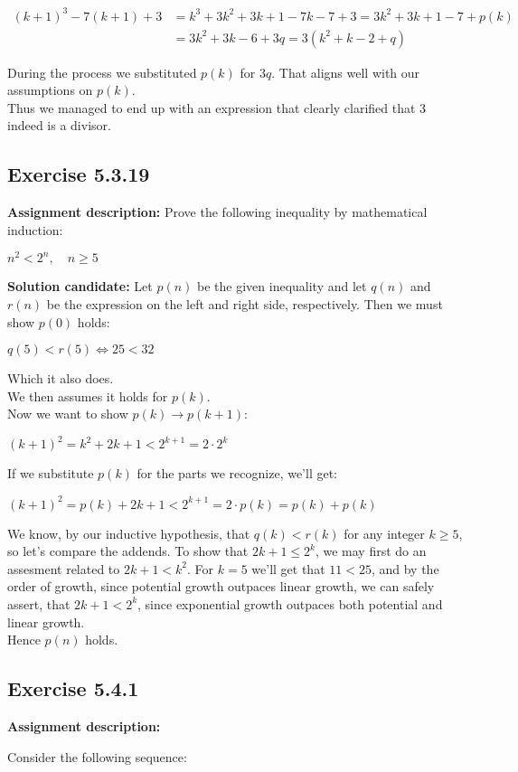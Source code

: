 \documentclass{report}
\newcommand{\cent}[1]{\begin{center}#1\end{center}}
\newcommand{\mAlign}[1]{\begin{align*}#1\end{align*}}
\newcommand{\AssignmentDescription}{\textbf{Assignment description: }}
\newcommand{\Solution}{\textbf{Solution candidate: }}
\newcommand{\QED}{\boxed{}}
\newcommand{\Exercise}[1]{\subsection{Exercise #1}}
\newcommand{\parenthesis}[1]{\left( #1 \right)}
\begin{document}
 	\mAlign{
 		(k+1)^3-7(k+1) + 3 &= k^3+3k^2+3k+1 -7k-7 + 3 = 3k^2+3k+1-7 + p(k) \\ 
 		&= 3k^2+3k-6 + 3q = 3 \parenthesis{k^2+k-2+q}
 	}
 	
 	During the process we substituted $p(k)$ for $3q$. That aligns well with our assumptions on $p(k)$.\\
 	
 	Thus we managed to end up with an expression that clearly clarified that 3 indeed is a divisor.\\
 	\QED
 	
 	\Exercise{5.3.19}
 	
 	\AssignmentDescription
 	Prove the following inequality by mathematical induction:
 	
 	\cent{$n^2 < 2^n, \quad n \geq 5$}
 	
 	\Solution
 	Let $p(n)$ be the given inequality and let $q(n)$ and $r(n)$ be the expression on the left and right side, respectively. Then we must show $p(0)$ holds:
 	
 	\cent{$ q(5) < r(5) \Leftrightarrow 25  < 32$}
 	
 	Which it also does.\\
 	
 	We then assumes it holds for $p(k)$.\\
 	
 	Now we want to show $p(k) \to p(k+1)$:
 	
 	\cent{$(k+1)^2 = k^2+2k+1 < 2^{k+1} = 2\cdot 2^k$}
 	
 	If we substitute $p(k)$ for the parts we recognize, we'll get:
 	
 	\cent{$(k+1)^2 = p(k) +2k+1 < 2^{k+1} = 2\cdot p(k) = p(k) + p(k)$}
 	
 	We know, by our inductive hypothesis, that $q(k) < r(k)$ for any integer $k \geq 5$, so let's compare the addends. To show that $ 2k+1 \leq 2^k  $, we may first do an assesment related to $2k + 1< k^2$. For $k=5$ we'll get that $11 < 25 $, and by the order of growth, since potential growth outpaces linear growth, we can safely assert, that $2k+1 < 2^k$, since exponential growth outpaces both potential and linear growth.\\ 
 	
 	Hence $p(n)$ holds.\\
 	\QED
 	
 	
 	\Exercise{5.4.1}
 	
 	\AssignmentDescription
 	
 	Consider the following sequence:
 	
\end{document}
